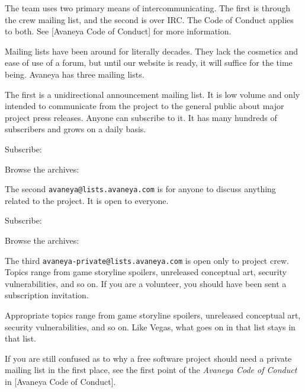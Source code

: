 
The team uses two primary means of intercommunicating. The first is through the crew mailing list, and the second is over IRC. The Code of Conduct applies to both. See [Avaneya Code of Conduct] for more information.

Mailing lists have been around for literally decades. They lack the cosmetics and ease of use of a forum, but until our website is ready, it will suffice for the time being. Avaneya has three mailing lists. 

The first is a unidirectional announcement mailing list. It is low volume and only intended to communicate from the project to the general public about major project press releases. Anyone can subscribe to it. It has many hundreds of subscribers and grows on a daily basis.

\blank[2*big]
\startnarrower[3*left]
Subscribe:\crlf
{} 

\blank[2*big]
Browse the archives:\crlf
{}
\stopnarrower

\blank[2*big]
The second {\tt avaneya@lists.avaneya.com} is for anyone to discuss anything related to the project. It is open to everyone.

\blank[2*big]
\startnarrower[3*left]
Subscribe:\crlf
{} 

\blank[2*big]
Browse the archives:\crlf
{}
\stopnarrower

\blank[2*big]
The third {\tt avaneya-private@lists.avaneya.com} is open only to project crew. Topics range from game storyline spoilers, unreleased conceptual art, security vulnerabilities, and so on. If you are a volunteer, you should have been sent a subscription invitation. 

Appropriate topics range from game storyline spoilers, unreleased conceptual art, security vulnerabilities, and so on. Like Vegas, what goes on in that list stays in that list.

If you are still confused as to why a free software project should need a private mailing list in the first place, see the first point of the {\it Avaneya Code of Conduct} in [Avaneya Code of Conduct].

